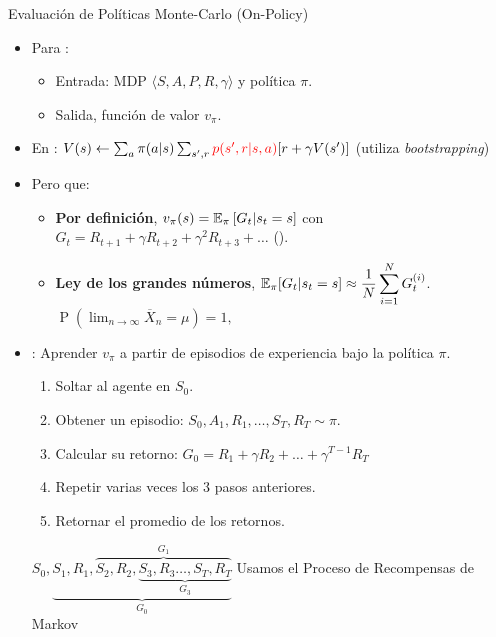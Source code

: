 \documentclass[10pt, envcountsect, handout, aspectratio=1610, hyperref={hypertexnames=true}]{beamer}
\begin{document}
\begin{frame}{Evaluación de Políticas Monte-Carlo (On-Policy)}
	
	\begin{itemize}
		\item Para :  
			\begin{itemize}
				\item Entrada: MDP $\langle S,A,P,R, \gamma \rangle$ y política $\pi$.
				\item Salida, función de valor $v_\pi$.
			\end{itemize}
		
		\item En   :  $V(s) \gets \sum_{a} \pi(a|s) \sum_{s', r} {\color{red}p(s', r | s, a)} [r + \gamma V(s')]$ (utiliza \textit{bootstrapping})
		
		\item Pero  que:
		
		\begin{itemize}
			\item\textbf{ Por definición}, $\displaystyle v_\pi(s) = \mathbb{E}_\pi \left[ G_t| s_t=s \right]$ con $	G_t = R_{t+1} + \gamma R_{t+2} + \gamma^2 R_{t+3} + \dots $ ().
		
		\item \textbf{Ley de los grandes números}, $\displaystyle\mathbb{E}_\pi[G_t|s_t=s] \approx  \frac{1}{N} \sum_{i=1}^{N} G_t^{(i)}$. \hfill$ {\displaystyle \operatorname {P} \left(\lim _{n\rightarrow \infty }{\overline {X}}_{n}=\mu \right)=1,}$ 
			
		\end{itemize}

	

			\item {}: Aprender $v_\pi$ a partir de episodios de experiencia bajo la política $\pi$.
				\begin{enumerate}
					\item Soltar al agente en $S_0$.
					\item Obtener un episodio: $S_0, A_1, R_1, \ldots, S_T, R_T \sim \pi$.
					\item Calcular su retorno: $G_0 = R_{1} + \gamma R_{2} + \ldots + \gamma^{T-1}R_T$
					\item Repetir varias veces los 3 pasos anteriores.
					\item Retornar el promedio de los retornos.
				\end{enumerate}
				
			\centerline{$S_0, \underbrace{S_1, R_1, \overbrace{S_2,R_2,\underbrace{S_3,R_3\ldots, S_T, R_T}_{G_3}}^{G_1}}_{G_0}$ \qquad Usamos el Proceso de Recompensas de Markov}

	\end{itemize}
\end{frame}
\end{document}
